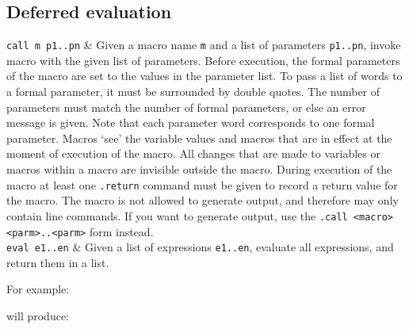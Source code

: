 \subsection{Deferred evaluation}
\begin{desctab}
{\tt call m p1..pn}
&
Given a macro name \verb+m+ and a list of parameters \verb+p1..pn+,
invoke macro with the given list of parameters.
Before execution,
the formal parameters of the macro are set to the values in the parameter list.
To pass a list of words to a formal parameter,
it must be surrounded by double quotes.
The number of parameters must match the number of formal parameters,
or else an error message is given.
Note that each parameter word corresponds to one formal parameter.
Macros `see' the variable values and macros that are in effect at the moment
of execution of the macro.
All changes that are made to variables or macros within a macro
are invisible outside the macro.
During execution of the macro at least one \verb+.return+ command must be
given to record a return value for the macro.
The macro is not allowed to generate output, and therefore may only contain
line commands.
If you want to generate output, 
use the \verb+.call <macro> <parm>..<parm>+ form instead.
\\
{\tt eval e1..en}
&
Given a list of expressions \verb+e1..en+, evaluate all expressions,
and return them in a list.
\\
\end{desctab}
For example:

will produce:

